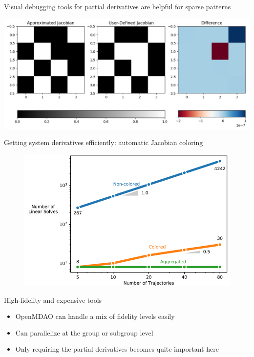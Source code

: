 \documentclass[aspectratio=169, usenames,dvipsnames, 14pt]{beamer}
\begin{document}
\begin{frame}{Visual debugging tools for partial derivatives are helpful for sparse patterns}
	
	\includegraphics[scale=.5]{images/slide_56_derivatives.png}

\end{frame}

\begin{frame}{Getting system derivatives efficiently: automatic Jacobian coloring}
	\begin{figure}
		\includegraphics[scale=0.45]{images/slide_121.png}
	\end{figure}
\end{frame}

\begin{frame}{High-fidelity and expensive tools}
	\begin{itemize}
		\item OpenMDAO can handle a mix of fidelity levels easily
		\item Can parallelize at the group or subgroup level
		\item Only requiring the partial derivatives becomes quite important here
	\end{itemize}
\end{frame}
\end{document}
